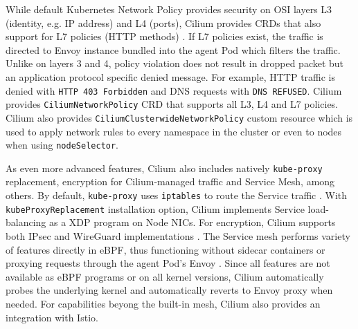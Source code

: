 \documentclass[english,12pt,a4paper,pdftex,sci,utf8]{aaltothesis}
\begin{document}
While default Kubernetes Network Policy provides security on OSI layers L3 (identity, e.g. IP address) and L4 (ports), Cilium provides CRDs that also support for L7 policies (HTTP methods) \cite{cilium-policy-language}. If L7 policies exist, the traffic is directed to Envoy instance bundled into the agent Pod which filters the traffic. Unlike on layers 3 and 4, policy violation does not result in dropped packet but an application protocol specific denied message. For example, HTTP traffic is denied with \texttt{HTTP 403 Forbidden} and DNS requests with \texttt{DNS REFUSED}. Cilium provides \texttt{CiliumNetworkPolicy} CRD that supports all L3, L4 and L7 policies. Cilium also provides \texttt{CiliumClusterwideNetworkPolicy} custom resource which is used to apply network rules to every namespace in the cluster or even to nodes when using \texttt{nodeSelector}.

As even more advanced features, Cilium also includes natively \texttt{kube-proxy} replacement, encryption for Cilium-managed traffic and Service Mesh, among others. By default, \texttt{kube-proxy} uses \texttt{iptables} to route the Service traffic \cite{cilium-proxy-free}. With \texttt{kubeProxyReplacement} installation option, Cilium implements Service load-balancing as a XDP program on Node NICs. For encryption, Cilium supports both IPsec and WireGuard implementations \cite{cilium-encryption}. The Service mesh performs variety of features directly in eBPF, thus functioning without sidecar containers or proxying requests through the agent Pod's Envoy \cite{cilium-service-mesh}. Since all features are not available as eBPF programs or on all kernel versions,  Cilium automatically probes the underlying kernel and automatically reverts to Envoy proxy when needed. For capabilities beyong the built-in mesh, Cilium also provides an integration with Istio.

\end{document}
